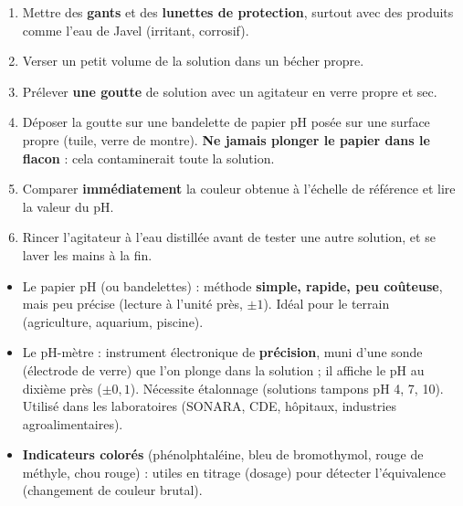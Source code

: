\documentclass[11pt]{article}
\newcommand{\cle}[1]{{\popxbold\color{popdark}#1}}
\begin{document}
\begin{methode}
\begin{enumerate}
\item Mettre des \textbf{gants} et des \textbf{lunettes de protection}, surtout avec des produits comme l'eau de Javel (irritant, corrosif).
\item Verser un petit volume de la solution dans un bécher propre.
\item Prélever \textbf{une goutte} de solution avec un agitateur en verre propre et sec.
\item Déposer la goutte sur une bandelette de papier pH posée sur une surface propre (tuile, verre de montre). \textbf{Ne jamais plonger le papier dans le flacon} : cela contaminerait toute la solution.
\item Comparer \textbf{immédiatement} la couleur obtenue à l'échelle de référence et lire la valeur du pH.
\item Rincer l'agitateur à l'eau distillée avant de tester une autre solution, et se laver les mains à la fin.
\end{enumerate}
\end{methode}

\begin{aretenir}
\begin{itemize}
\item Le \cle{papier pH} (ou bandelettes) : méthode \textbf{simple, rapide, peu coûteuse}, mais peu précise (lecture à l'unité près, $\pm 1$). Idéal pour le terrain (agriculture, aquarium, piscine).
\item Le \cle{pH-mètre} : instrument électronique de \textbf{précision}, muni d'une sonde (électrode de verre) que l'on plonge dans la solution ; il affiche le pH au dixième près ($\pm 0,1$). Nécessite étalonnage (solutions tampons pH 4, 7, 10). Utilisé dans les laboratoires (SONARA, CDE, hôpitaux, industries agroalimentaires).
\item \textbf{Indicateurs colorés} (phénolphtaléine, bleu de bromothymol, rouge de méthyle, chou rouge) : utiles en titrage (dosage) pour détecter l'équivalence (changement de couleur brutal).
\end{itemize}
\end{aretenir}
\end{document}
